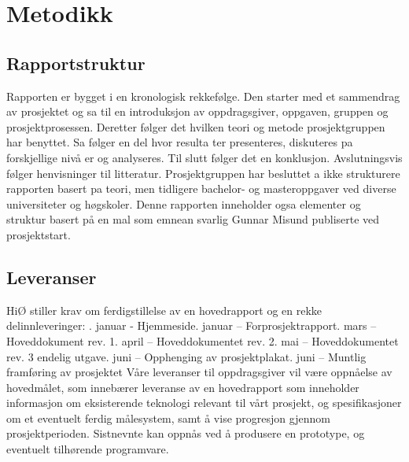 

\chapter{Metodikk}

\section{Rapportstruktur}
{\color{red}
Rapporten er bygget i en kronologisk rekkefølge. Den starter med et sammendrag av prosjektet og sa til en introduksjon av oppdragsgiver, oppgaven, gruppen og prosjektprosessen.\newline
Deretter følger det hvilken teori og metode prosjektgruppen har benyttet. Sa følger en del hvor resulta ter presenteres, diskuteres pa forskjellige nivå er og analyseres. Til slutt følger det en konklusjon.\newline
Avslutningsvis følger henvisninger til litteratur.\newline
Prosjektgruppen har besluttet a ikke strukturere rapporten basert pa teori, men tidligere bachelor- og masteroppgaver ved diverse universiteter og høgskoler.\newline
Denne rapporten inneholder ogsa elementer og struktur basert på en mal som emnean svarlig Gunnar Misund publiserte ved prosjektstart.
}

\section{Leveranser}
{\color{red}

HiØ stiller krav om ferdigstillelse av en hovedrapport og en rekke delinnleveringer: . januar - Hjemmeside. januar – Forprosjektrapport. mars – Hoveddokument rev. 1. april – Hoveddokumentet rev. 2. mai – Hoveddokumentet rev. 3 endelig utgave. juni – Opphenging av prosjektplakat. juni – Muntlig framføring av prosjektet\newline
Våre leveranser til oppdragsgiver vil være oppnåelse av hovedmålet, som innebærer\newline
leveranse av en hovedrapport som inneholder informasjon om eksisterende teknologi\newline
relevant til vårt prosjekt, og spesifikasjoner om et eventuelt ferdig målesystem, samt å vise\newline
progresjon gjennom prosjektperioden. Sistnevnte kan oppnås ved å produsere en prototype,\newline
og eventuelt tilhørende programvare.\newline
}
\newpage

